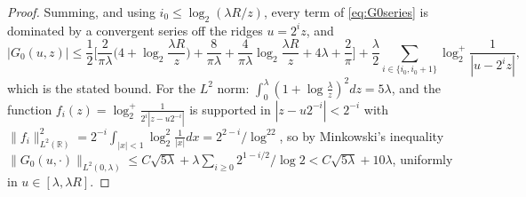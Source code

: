 \documentclass[11pt]{amsart}
\theoremstyle{definition}
\theoremstyle{remark}
\newcommand{\R}{\mathbb R}
\begin{document}
\begin{proof}
Summing, and using $i_0\le\log_2(\lambda R/z)$, every term of \eqref{eq:G0series} is dominated by a convergent series
off the ridges $u=2^iz$, and
\[
|G_0(u,z)|\le\frac1{2}\Big[\frac{2}{\pi\lambda}\Big(4+\log_2\frac{\lambda R}z\Big)+\frac{8}{\pi\lambda}+\frac{4}{\pi\lambda}\log_2\frac{\lambda R}z
+4\lambda+\frac2\pi\Big]+\frac\lambda2\sum_{i\in\{i_0,i_0+1\}}\log_2^+\frac1{|u-2^iz|},
\]
which is the stated bound. For the $L^2$ norm: $\int_0^\lambda(1+\log\frac\lambda z)^2dz=5\lambda$, and the function
$f_i(z)=\log_2^+\frac1{2^i|z-u2^{-i}|}$ is supported in $|z-u2^{-i}|<2^{-i}$ with
$\|f_i\|_{L^2(\R)}^2=2^{-i}\int_{|x|<1}\log_2^2\frac1{|x|}dx=2^{2-i}/\log^22$, so by Minkowski's inequality
$\|G_0(u,\cdot)\|_{L^2(0,\lambda)}\le C\sqrt{5\lambda}+\lambda\sum_{i\ge0}2^{1-i/2}/\log2<C\sqrt{5\lambda}+10\lambda$, uniformly in
$u\in[\lambda,\lambda R]$.
\end{proof}
\end{document}
